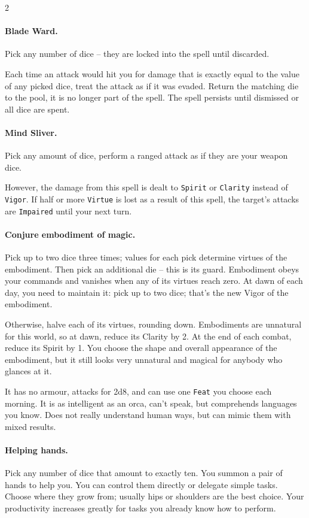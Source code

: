 \begin{multicols*}{2}

\paragraph{Blade Ward.} Pick any number of dice -- they are locked into the spell until discarded.

Each time an attack would hit you for damage that is exactly equal to the value of any picked dice, treat the attack as if it was evaded. 
Return the matching die to the pool, it is no longer part of the spell. The spell persists until dismissed or all dice are spent.

\paragraph{Mind Sliver.} Pick any amount of dice, perform a ranged attack as if they are your weapon dice. 

However, the damage from this spell is dealt to \texttt{Spirit} or \texttt{Clarity} instead of \texttt{Vigor}. 
If half or more \texttt{Virtue} is lost as a result of this spell, the target's attacks are \texttt{Impaired} until your next turn.

\paragraph{Conjure embodiment of magic.} Pick up to two dice three times; values for each pick determine virtues of the embodiment.
Then pick an additional die -- this is its guard.
Embodiment obeys your commands and vanishes when any of its virtues reach zero.
At dawn of each day, you need to maintain it: pick up to two dice; that's the new Vigor of the embodiment.

Otherwise, halve each of its virtues, rounding down. Embodiments are unnatural for this world, so at dawn, reduce its Clarity by 2.
At the end of each combat, reduce its Spirit by 1.
You choose the shape and overall appearance of the embodiment, but it still looks very unnatural and magical for anybody who glances at it.

It has no armour, attacks for 2d8, and can use one \texttt{Feat} you choose each morning.
It is as intelligent as an orca, can't speak, but comprehends languages you know.
Does not really understand human ways, but can mimic them with mixed results.

\paragraph{Helping hands.} Pick any number of dice that amount to exactly ten. 
You summon a pair of hands to help you. 
You can control them directly or delegate simple tasks. Choose where they grow from; usually hips or shoulders are the best choice.
Your productivity increases greatly for tasks you already know how to perform. 


\end{multicols*}
